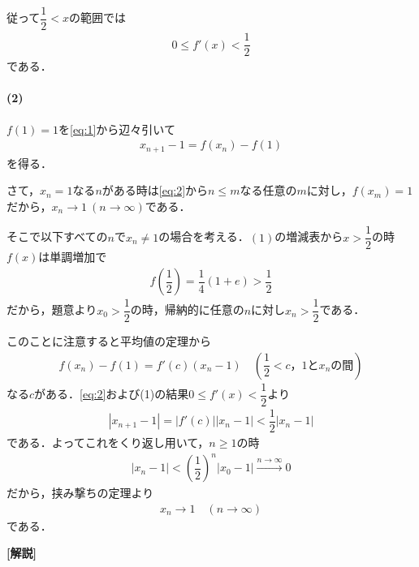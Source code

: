 \documentclass[../../main.tex]{subfiles}
\begin{document}
従って$\dfrac{1}{2}<x$の範囲では
\begin{align}
  0 \le f'(x) < \dfrac{1}{2}
\end{align}
である．

\paragraph{(2)}

$f(1)=1$を\cref{eq:1}から辺々引いて
\begin{align}
  x_{n+1}-1=f(x_n)-f(1) \label{eq:2}
\end{align}
を得る．

さて，$x_n=1$なる$n$がある時は\cref{eq:2}から$n\le m$なる任意の$m$に対し，$f(x_m)=1$だから，$x_n\to1\ (n\to\infty)$である．

そこで以下すべての$n$で$x_n\ne1$の場合を考える．$(1)$の増減表から$x>\dfrac{1}{2}$の時$f(x)$は単調増加で
\begin{align}
  f\left(\dfrac{1}{2}\right)=\dfrac{1}{4}(1+e)>\dfrac{1}{2}
\end{align}
だから，題意より$x_0>\dfrac{1}{2}$の時，帰納的に任意の$n$に対し$x_n>\dfrac{1}{2}$である．

このことに注意すると平均値の定理から
\begin{align}
  f(x_n)-f(1)=f'(c)(x_n-1)\quad \left(\dfrac{1}{2}<c\text{，}1\text{と}x_n\text{の間}\right)
\end{align}
なる$c$がある．\cref{eq:2}および(1)の結果$0\le f'(x) < \dfrac{1}{2}$より
\begin{align}
  |x_{n+1}-1|=|f'(c)||x_n-1|<\dfrac{1}{2}|x_n-1|
\end{align}
である．よってこれをくり返し用いて，$n \ge 1$の時
\begin{align}
  |x_n-1|<\left(\dfrac{1}{2}\right)^n|x_0-1|
  \xrightarrow{n\to\infty} 0
\end{align}
だから，挟み撃ちの定理より
\begin{align}
  x_n\longrightarrow1\quad(n\to\infty)
\end{align}
である．

{\bf [解説]}
\end{document}
